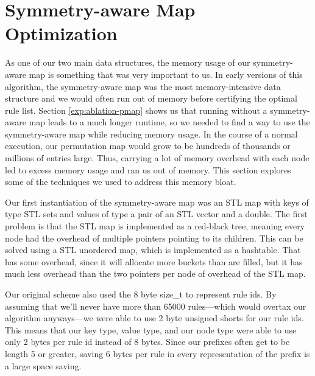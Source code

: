 \section{Symmetry-aware Map Optimization}
As one of our two main data structures, the memory usage of our symmetry-aware map is something that was very important to us.
In early versions of this algorithm, the symmetry-aware map was the most memory-intensive data structure and we would often run out of memory before certifying the optimal rule list.
Section \ref{exp:ablation-pmap} shows us that running without a symmetry-aware map leads to a much longer runtime, so we needed to find a way to use the symmetry-aware map while reducing memory usage. 
In the course of a normal execution, our permutation map would grow to be hundreds of thousands or millions of entries large.
Thus, carrying a lot of memory overhead with each node led to excess memory usage and ran us out of memory.
This section explores some of the techniques we used to address this memory bloat.

Our first instantiation of the symmetry-aware map was an STL map with keys of type STL sets and values of type a pair of an STL vector and a double.
The first problem is that the STL map is implemented as a red-black tree, meaning every node had the overhead of multiple pointers pointing to its children.
This can be solved using a STL unordered map, which is implemented as a hashtable.
That has some overhead, since it will allocate more buckets than are filled, but it has much less overhead than the two pointers per node of overhead of the STL map.

Our original scheme also used the 8 byte size\_t to represent rule ids.
By assuming that we'll never have more than 65000 rules---which would overtax our algorithm anyways---we were able to use 2 byte unsigned shorts for our rule ids.
This means that our key type, value type, and our node type were able to use only 2 bytes per rule id instead of 8 bytes.
Since our prefixes often get to be length 5 or greater, saving 6 bytes per rule in every representation of the prefix is a large space saving.

